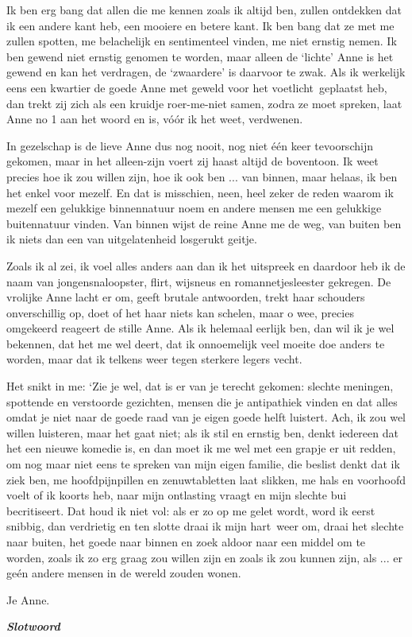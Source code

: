 \documentclass{book}
\begin{document}
Ik ben erg bang dat allen die me kennen zoals ik altijd ben, zullen ontdekken
dat ik een andere kant heb, een mooiere en betere kant. Ik ben bang dat ze met
me zullen spotten, me belachelijk en sentimenteel vinden, me niet ernstig nemen.
Ik ben gewend niet ernstig genomen te worden, maar alleen de `lichte' Anne is
het gewend en kan het verdragen, de `zwaardere' is daarvoor te zwak. Als ik
werkelijk eens een kwartier de goede Anne met geweld voor het
voetlicht~geplaatst heb, dan trekt zij zich als een kruidje roer-me-niet samen,
zodra ze moet spreken, laat Anne no 1 aan het woord en is, vóór ik het weet,
verdwenen.

In gezelschap is de lieve Anne dus nog nooit, nog niet één keer tevoorschijn
gekomen, maar in het alleen-zijn voert zij haast altijd de boventoon. Ik weet
precies hoe ik zou willen zijn, hoe ik ook ben ...  van binnen, maar helaas, ik
ben het enkel voor mezelf. En dat is misschien, neen, heel zeker de reden waarom
ik mezelf een gelukkige binnennatuur noem en andere mensen me een gelukkige
buitennatuur vinden.  Van binnen wijst de reine Anne me de weg, van buiten ben
ik niets dan een van uitgelatenheid losgerukt geitje.

Zoals ik al zei, ik voel alles anders aan dan ik het uitspreek en daardoor heb
ik de naam van jongensnaloopster, flirt, wijsneus en romannetjesleester
gekregen. De vrolijke Anne lacht er om, geeft brutale antwoorden, trekt haar
schouders onverschillig op, doet of het haar niets kan schelen, maar o wee,
precies omgekeerd reageert de stille Anne. Als ik helemaal eerlijk ben, dan wil
ik je wel bekennen, dat het me wel deert, dat ik onnoemelijk veel moeite doe
anders te worden, maar dat ik telkens weer tegen sterkere legers vecht.

Het snikt in me: `Zie je wel, dat is er van je terecht gekomen: slechte
meningen, spottende en verstoorde gezichten, mensen die je antipathiek vinden en
dat alles omdat je niet naar de goede raad van je eigen goede helft luistert.
Ach, ik zou wel willen luisteren, maar het gaat niet; als ik stil en ernstig
ben, denkt iedereen dat het een nieuwe komedie is, en dan moet ik me wel met een
grapje er uit redden, om nog maar niet eens te spreken van mijn eigen familie,
die beslist denkt dat ik ziek ben, me hoofdpijnpillen en zenuwtabletten laat
slikken, me hals en voorhoofd voelt of ik koorts heb, naar mijn ontlasting
vraagt en mijn slechte bui becritiseert. Dat houd ik niet vol: als er zo op me
gelet wordt, word ik eerst snibbig, dan verdrietig en ten slotte draai ik mijn
hart~weer om, draai het slechte naar buiten, het goede naar binnen en zoek
aldoor naar een middel om te worden, zoals ik zo erg graag zou willen zijn en
zoals ik zou kunnen zijn, als ... er geén andere mensen in de wereld zouden
wonen.

Je Anne.

\emph{\textbf{Slotwoord}}
\end{document}
